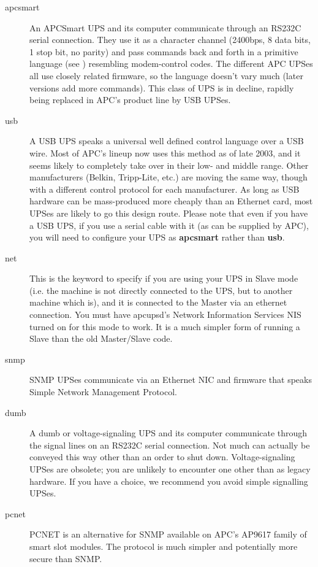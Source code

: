 \begin{description}

\item [apcsmart]
   An APCSmart UPS and its computer communicate through an RS232C serial
connection. They use it as a character channel (2400bps, 8 data bits, 1 stop
bit, no parity) and pass commands back and forth in a primitive language 
(see ) resembling
modem-control codes.  The different APC UPSes all use closely related
firmware, so the language doesn't vary much (later versions add more
commands). This class of UPS is in decline, rapidly being replaced in APC's
product line by USB UPSes.  

\item [usb]
   A USB UPS speaks a universal well defined control language over a USB wire. 
Most of APC's lineup now uses this method as of late 2003, and it seems likely
to completely take over in their low- and middle range.  Other manufacturers
(Belkin, Tripp-Lite, etc.) are moving the same way, though with a different
control protocol for each manufacturer.  As long as USB hardware can be
mass-produced more cheaply than an Ethernet card, most UPSes are likely to go
this design route. Please note that even if you have a USB UPS, if you use a
serial cable with it (as can be supplied by APC), you will need to configure
your UPS as {\bf apcsmart} rather than {\bf usb}.  

\item [net]
   This is the keyword to specify if you are using your UPS in Slave mode (i.e.
the machine is not directly connected to the UPS, but to another machine which
is), and it is connected to the Master via an ethernet connection. You must
have apcupsd's Network Information Services NIS turned on for this mode to
work. It is a much simpler form of running a Slave than the old Master/Slave
code.  

\item [snmp]
   SNMP UPSes communicate via an Ethernet NIC and firmware that speaks Simple
Network Management Protocol.  

\item [dumb]
   A dumb or voltage-signaling UPS and its computer communicate through the
signal lines on an RS232C serial connection.  Not much can actually be
conveyed this way other than an order to shut down. Voltage-signaling UPSes
are obsolete; you are unlikely to encounter one other than as legacy hardware.
If you have a choice, we recommend you avoid simple signalling UPSes.  

\item [pcnet]
   PCNET is an alternative for SNMP available on APC's AP9617 family of smart
slot modules. The protocol is much simpler and potentially more secure than 
SNMP.
\end{description}

